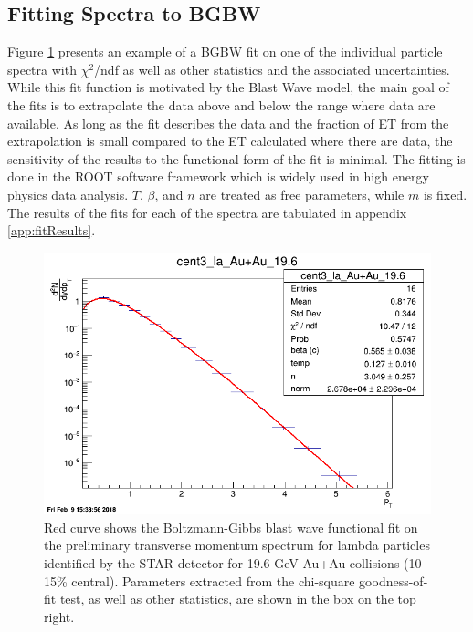 \subsection{Fitting Spectra to BGBW}
Figure \ref{fig:fit} presents an example of a BGBW fit on one of the individual particle spectra with $\chi^{2}$/ndf as well as other statistics and the associated uncertainties. While this fit function is motivated by the Blast Wave model, the main goal of the fits is to extrapolate the data above and below the range where data are available. As long as the fit describes the data and the fraction of ET from the extrapolation is small compared to the ET calculated where there are data, the sensitivity of the results to the functional form of the fit is minimal. The fitting is done in the ROOT software framework which is widely used in high energy physics data analysis. $T$, $\beta$, and $n$ are treated as free parameters, while $m$ is fixed. The results of the fits for each of the spectra are tabulated in appendix \ref{app:fitResults}. 

	\begin{figure}[h]
	  \centering
	  \includegraphics[width=6.5in]{figures/cent3_la_Au+Au_196.png}
	  \caption{Red curve shows the Boltzmann-Gibbs blast wave functional fit on the preliminary transverse momentum spectrum for lambda particles identified by the STAR detector for 19.6 GeV Au+Au collisions (10-15\% central). Parameters extracted from the chi-square goodness-of-fit test, as well as other statistics, are shown in the box on the top right.}\label{fig:fit}
	\end{figure}


